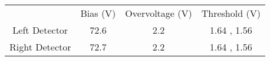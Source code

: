 \begin{table}
\label{A Label}
\begin{tabular}{cccc}
& Bias (V) & Overvoltage (V) & Threshold (V) \\
Left Detector  &     72.6 &             2.2 &   1.64 , 1.56 \\
Right Detector &     72.7 &             2.2 &   1.64 , 1.56 \\
\end{tabular}
\end{table}

